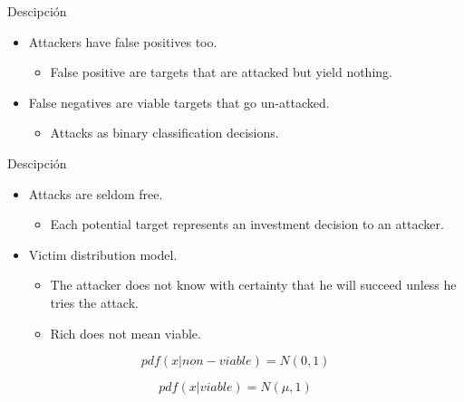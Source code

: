 \documentclass[ignorenonframetext,]{beamer}
\begin{document}
\begin{frame}{Descipción}

\begin{itemize}
\item
  Attackers have false positives too.

  \begin{itemize}
  \itemsep1pt\parskip0pt
  \item
    False positive are targets that are attacked but yield nothing.
  \end{itemize}
\item
  False negatives are viable targets that go un-attacked.

  \begin{itemize}
  \itemsep1pt\parskip0pt
  \item
    Attacks as binary classification decisions.
  \end{itemize}
\end{itemize}

\end{frame}

\begin{frame}{Descipción}

\begin{itemize}
\item
  Attacks are seldom free.

  \begin{itemize}
  \itemsep1pt\parskip0pt
  \item
    Each potential target represents an investment decision to an
    attacker.
  \end{itemize}
\item
  Victim distribution model.

  \begin{itemize}
  \item
    The attacker does not know with certainty that he will succeed
    unless he tries the attack.
  \item
    Rich does not mean viable.
  \end{itemize}
\end{itemize}

\[ pdf(x|non-viable)=N(0,1)\]

\[pdf(x|viable)=N(\mu,1)\]

\end{frame}
\end{document}
